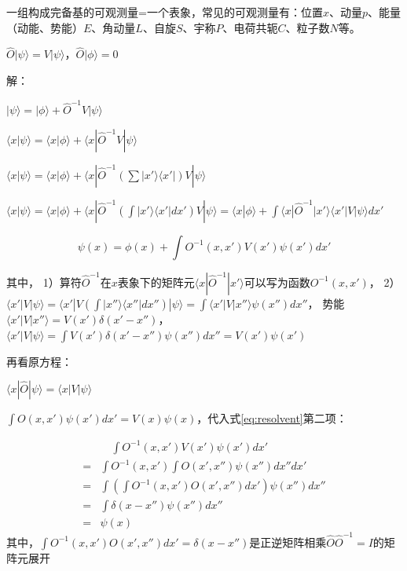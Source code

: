 一组构成完备基的可观测量=一个表象，常见的可观测量有：位置$x$、动量$p$、能量（动能、势能）$E$、角动量$L$、自旋$S$、宇称$P$、电荷共轭$C$、粒子数$N$等。

$\hat{O}|\psi\rangle=V|\psi\rangle$，$\hat{O}|\phi\rangle=0$

解：

$|\psi\rangle=|\phi\rangle+\hat{O}^{-1}V|\psi\rangle$

$\langle x|\psi\rangle=\langle x|\phi\rangle+\langle x|\hat{O}^{-1}V|\psi\rangle$

$\langle x|\psi\rangle=\langle x|\phi\rangle+\langle x|\hat{O}^{-1}(\sum |x'\rangle\langle x'|)V|\psi\rangle$

$\langle x|\psi\rangle=\langle x|\phi\rangle+\langle x|\hat{O}^{-1}(\int |x'\rangle\langle x'|dx') V|\psi\rangle=\langle x|\phi\rangle+\int \langle x|\hat{O}^{-1}|x'\rangle\langle x'|V|\psi\rangle dx'$

\begin{equation}
    \psi(x)=\phi(x)+\int O^{-1}(x,x') V(x') \psi(x') dx'
    \label{eq:resolvent}
\end{equation}

其中，
1）算符$\hat{O}^{-1}$在$x$表象下的矩阵元$\langle x|\hat{O}^{-1}|x'\rangle$可以写为函数$O^{-1}(x,x')$，
2）$\langle x'|V|\psi\rangle=\langle x'|V(\int |x''\rangle\langle x''|dx'') |\psi\rangle=\int \langle x'|V|x''\rangle \psi(x'')dx''$，
势能$\langle x'|V|x''\rangle=V(x')\delta(x'-x'')$，
$\langle x'|V|\psi\rangle=\int V(x')\delta(x'-x'') \psi(x'') dx''=V(x')\psi(x')$

再看原方程：

$\langle x|\hat{O}|\psi\rangle=\langle x|V|\psi\rangle$

$\int O(x,x')\psi(x')dx'=V(x)\psi(x)$，代入式\eqref{eq:resolvent}第二项：

\begin{equation}
    \begin{split}
    &\quad \int O^{-1}(x,x') V(x') \psi(x') dx'\\
    =& \int O^{-1}(x,x') \int O(x',x'')\psi(x'')dx'' dx'\\
    =& \int (\int O^{-1}(x,x') O(x',x'')dx')\psi(x'') dx''\\
    =& \int \delta(x-x'')\psi(x'') dx''\\
    =& \psi(x)
    \end{split}
\end{equation}
其中，$\int O^{-1}(x,x') O(x',x'')dx'=\delta(x-x'')$是正逆矩阵相乘$\hat{O}\hat{O}^{-1}=I$的矩阵元展开


